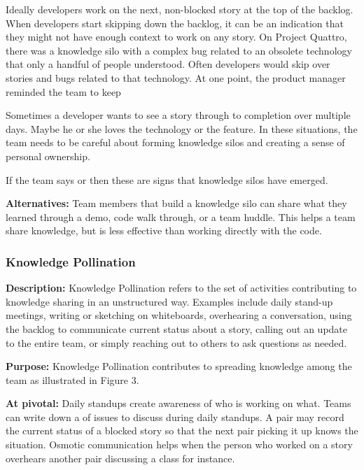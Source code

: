 \begin{table}[]
Ideally developers work on the next, non-blocked story at the top of the backlog. When developers start skipping down the backlog, it can be an indication that they might not have enough context to work on any story. On Project Quattro, there was a knowledge silo with a complex bug related to an obsolete technology that only a handful of people understood. Often developers would skip over stories and bugs related to that technology. At one point, the product manager reminded the team to keep 

Sometimes a developer wants to see a story through to completion over multiple days. Maybe he or she loves the technology or the feature. In these situations, the team needs to be careful about forming knowledge silos and creating a sense of personal ownership.

If the team says  or  then these are signs that knowledge silos have emerged. 

\textbf{Alternatives:} Team members that build a knowledge silo can share what they learned through a demo, code walk through, or a team huddle. This helps a team share knowledge, but is less effective than working directly with the code. 

\subsubsection{Knowledge Pollination}
\textbf{Description:} Knowledge Pollination refers to the set of activities contributing to knowledge sharing in an unstructured way. Examples include daily stand-up meetings, writing or sketching on whiteboards, overhearing a conversation, using the backlog to communicate current status about a story, calling out an update to the entire team, or simply reaching out to others to ask questions as needed. 

\textbf{Purpose:} Knowledge Pollination contributes to spreading knowledge among the team as illustrated in Figure 3.

\textbf{At pivotal:} Daily standups create awareness of who is working on what. Teams can write down a  of issues to discuss during daily standups. A pair may record the current status of a blocked story so that the next pair picking it up knows the situation. Osmotic communication helps when the person who worked on a story overhears another pair discussing a class for instance.


\end{table}
